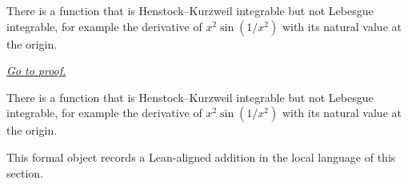 \begin{dependencies}
\NoLocalDependencies
\end{dependencies}
\begin{theorem}
\label{thm:hk-strictly-wider-than-lebesgue-witness}
There is a function that is Henstock--Kurzweil integrable but not Lebesgue integrable, for example the derivative of $x^2\sin(1/x^2)$ with its natural value at the origin.

\smallskip
\noindent
\hyperref[prf:hk-strictly-wider-than-lebesgue-witness]{\textit{Go to proof.}}
\end{theorem}

\begin{remark*}
There is a function that is Henstock--Kurzweil integrable but not Lebesgue integrable, for example the derivative of $x^2\sin(1/x^2)$ with its natural value at the origin.
\end{remark*}

\begin{remark*}[Interpretation]
This formal object records a Lean-aligned addition in the local language of this section.
\end{remark*}

\begin{dependencies}
\NoLocalDependencies
\end{dependencies}
